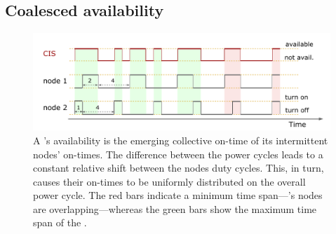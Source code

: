 \subsection{Coalesced availability}
\label{subSec:availability}
%
\begin{figure}[t]
		\centering
		\includegraphics[width=\columnwidth]{figures/cisOntime}
		\caption{A \fullsys's availability is the emerging collective on-time of its intermittent nodes' on-times. The difference between the power cycles leads to a constant relative shift between the nodes duty cycles. This, in turn, causes their on-times to be uniformly distributed on the overall power cycle. The red bars indicate a minimum \sys time span---\sys's nodes are overlapping---whereas the green bars show the maximum time span of the \sys.}
		\label{fig:cisOntime}
\end{figure} 
%

